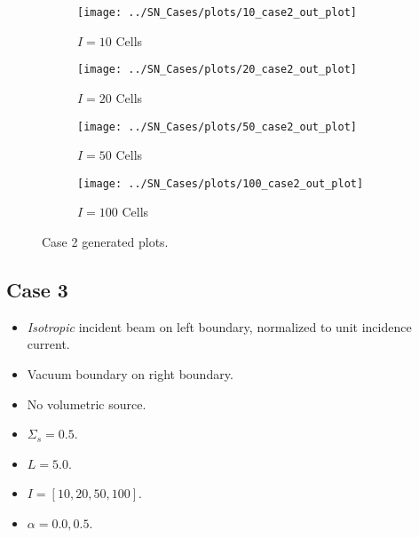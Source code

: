\documentclass{NE515}
\theoremstyle{definition}
\begin{document}
    \begin{figure}
        \centering
        \begin{subfigure}{0.45\linewidth}
            \centering
            \texttt{[image: ../SN\_Cases/plots/10\_case2\_out\_plot]}
            \caption{$I=10$ Cells}
        \end{subfigure}
        \hfill
        \begin{subfigure}{0.45\linewidth}
            \centering
            \texttt{[image: ../SN\_Cases/plots/20\_case2\_out\_plot]}
            \caption{$I=20$ Cells}
        \end{subfigure}
        \hfill
        \begin{subfigure}{0.45\linewidth}
            \centering
            \texttt{[image: ../SN\_Cases/plots/50\_case2\_out\_plot]}
            \caption{$I=50$ Cells}
        \end{subfigure}
        \hfill
        \begin{subfigure}{0.45\linewidth}
            \centering
            \texttt{[image: ../SN\_Cases/plots/100\_case2\_out\_plot]}
            \caption{$I=100$ Cells}
        \end{subfigure}

        \caption{Case 2 generated plots.}
        \label{fig:case-2}
    \end{figure}

    \subsection{Case 3}
    \begin{itemize}
        \item \textit{Isotropic} incident beam on left boundary, normalized to unit incidence current.
        \item Vacuum boundary on right boundary.
        \item No volumetric source.
        \item $\Sigma_s=0.5$.
        \item $L=5.0$.
        \item $I=[10,20,50,100]$.
        \item $\alpha=0.0, 0.5$.
    \end{itemize}
\end{document}
